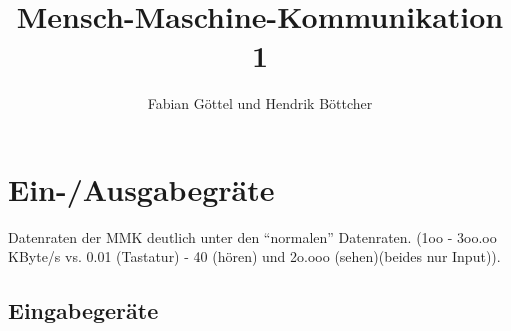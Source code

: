 \documentclass[german,color,6pt]{latex4ei/latex4ei_sheet}
\title{Mensch-Maschine-Kommunikation 1}
\author{Fabian Göttel und Hendrik Böttcher}
\makeatletter
\renewcommand\paragraph{\@startsection{paragraph}{4}{\z@}%
                                    {3.25ex \@plus1ex \@minus.2ex}%
                                    {-1em}%
                                    {\normalfont\normalsize\bfseries}}
\makeatother
\begin{document}

\maketitle




\section{Ein-/Ausgabegräte}
\begin{symbolbox}
Datenraten der MMK deutlich unter den "`normalen"' Datenraten. (1oo - 3oo.oo KByte/s vs. 0.01 (Tastatur) - 40 (hören) und 2o.ooo (sehen)(beides nur Input)).
\end{symbolbox}

\subsection{Eingabegeräte}
\end{document}
